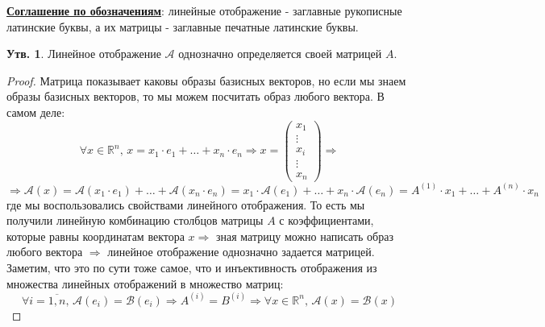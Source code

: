 \documentclass[12pt]{article}
\newcommand{\MR}{\mathbb{R}}
\newcommand{\MA}{\mathcal{A}}
\newcommand{\MCB}{\mathcal{B}}
\theoremstyle{definition}
\newtheorem{prop}{Утв.}
\begin{document}
\uline{\textbf{Соглашение по обозначениям}}: линейные отображение - заглавные рукописные латинские буквы, а их матрицы - заглавные печатные латинские буквы.
\begin{prop}
	Линейное отображение $\MA$ однозначно определяется своей матрицей $A$.
\end{prop}
\begin{proof}
	Матрица показывает каковы образы базисных векторов, но если мы знаем образы базисных векторов, то мы можем посчитать образ любого вектора. В самом деле:
	$$
		\forall x \in \MR^n, \, x = x_1{\cdot} e_1 + \dotsc + x_n{\cdot} e_n \Rightarrow x = \begin{pmatrix}
			x_1 \\
			\vdots\\
			x_i\\
			\vdots\\
			x_n
		\end{pmatrix} \Rightarrow 
	$$
	$$
		\Rightarrow \MA(x) = \MA(x_1 {\cdot}e_1) + \dotsc + \MA(x_n{\cdot} e_n)  = x_1{\cdot}\MA(e_1) + \dotsc + x_n {\cdot}\MA(e_n) = A^{(1)}{\cdot}x_1 + \dotsc + A^{(n)}{\cdot}x_n
	$$
	где мы воспользовались свойствами линейного отображения. То есть мы получили линейную комбинацию столбцов матрицы $A$ с коэффициентами, которые равны координатам вектора $x \Rightarrow$ зная матрицу можно написать образ любого вектора $\Rightarrow$ линейное отображение однозначно задается матрицей. Заметим, что это по сути тоже самое, что и инъективность отображения из множества линейных отображений в множество матриц:
	$$
		\forall i = \overline{1,n}, \, \MA(e_i) = \MCB(e_i) \Rightarrow A^{(i)} = B^{(i)} \Rightarrow \forall x \in \MR^n, \, \MA(x) = \MCB(x) 
	$$
\end{proof}
\end{document}
